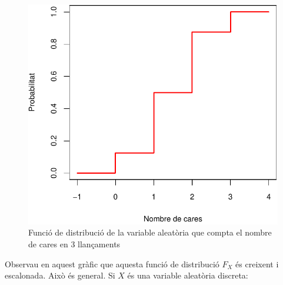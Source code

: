 \documentclass[
]{book}
\theoremstyle{definition}
\theoremstyle{definition}
\theoremstyle{definition}
\theoremstyle{remark}
\begin{document}
\begin{figure}

{\centering \includegraphics[width=0.6\linewidth]{Bioestadistica-II_files/figure-latex/districares-1} 

}

\caption{Funció de distribució de la variable aleatòria que compta el nombre de cares en 3 llançaments}\label{fig:districares}
\end{figure}

Observau en aquest gràfic que aquesta funció de distribució \(F_X\) és creixent i escalonada. Això és general. Si \(X\) és una variable aleatòria discreta:
\end{document}
